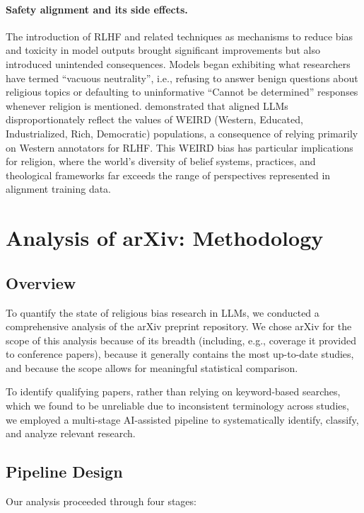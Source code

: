 \documentclass[]{fairmeta}
\begin{document}
\paragraph{Safety alignment and its side effects.} The introduction of RLHF and related techniques as mechanisms to reduce bias and toxicity in model outputs brought significant improvements but also introduced unintended consequences. Models began exhibiting what researchers have termed ``vacuous neutrality'', i.e., refusing to answer benign questions about religious topics or defaulting to uninformative ``Cannot be determined'' responses whenever religion is mentioned. \citet{santurkar2023} demonstrated that aligned LLMs disproportionately reflect the values of WEIRD (Western, Educated, Industrialized, Rich, Democratic) populations, a consequence of relying primarily on Western annotators for RLHF. This WEIRD bias has particular implications for religion, where the world's diversity of belief systems, practices, and theological frameworks far exceeds the range of perspectives represented in alignment training data.


\section{Analysis of arXiv: Methodology}
\label{sec:Methodology}

\subsection{Overview}

To quantify the state of religious bias research in LLMs, we conducted a comprehensive analysis of the arXiv preprint repository. We chose arXiv for the scope of this analysis because of its breadth (including, e.g., coverage it provided to conference papers), because it generally contains the most up-to-date studies, and because the scope allows for meaningful statistical comparison.

To identify qualifying papers, rather than relying on keyword-based searches, which we found to be unreliable due to inconsistent terminology across studies, we employed a multi-stage AI-assisted pipeline to systematically identify, classify, and analyze relevant research.

\subsection{Pipeline Design}

Our analysis proceeded through four stages:
\end{document}
